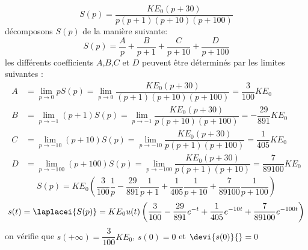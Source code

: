 \[
S(p)=\dfrac{KE_0(p+30)}{p(p+1)(p+10)(p+100)}
\]
décomposons $S(p)$ de la manière suivante:
\[
S(p)=\dfrac{A}{p}+\dfrac{B}{p+1}+\dfrac{C}{p+10}+\dfrac{D}{p+100}
\]
les différents coefficients $A$,$B$,$C$ et $D$ peuvent être déterminés par 
les limites suivantes :
\begin{align*}
    A&=\lim\limits_{p \rightarrow 0} p S(p) = 
    \lim\limits_{p \rightarrow 0} 
    \dfrac{KE_0(p+30)}{(p+1)(p+10)(p+100)} =
    \dfrac{3}{100}KE_0 \\
    B&=\lim\limits_{p \rightarrow -1} (p+1) S(p) = 
    \lim\limits_{p \rightarrow -1} 
    \dfrac{KE_0(p+30)}{p(p+10)(p+100)}=
    -\dfrac{29}{891}KE_0\\
    C&=\lim\limits_{p \rightarrow -10} (p+10) S(p) = 
    \lim\limits_{p \rightarrow -10} 
    \dfrac{KE_0(p+30)}{p(p+1)(p+100)}=
    \dfrac{1}{405}KE_0 \\
    D&=\lim\limits_{p \rightarrow -100} (p+100) S(p) = 
    \lim\limits_{p \rightarrow -100} 
    \dfrac{KE_0(p+30)}{p(p+1)(p+10)}=
    \dfrac{7}{89100}KE_0 
\end{align*}
\[
S(p) = KE_0\left(\dfrac{3}{100}  \dfrac{1}{p} -\dfrac{29}{891}\dfrac{1}{p+1} +
                                 \dfrac{1}{405}\dfrac{1}{p+10} + 
                                 \dfrac{7}{89100}\dfrac{1}{p+100} \right)
\]
\[
s(t) = \laplacei{S(p)} = KE_0u(t)\left(\dfrac{3}{100} - 
                         \dfrac{29}{891}e^{-t}+\dfrac{1}{405}e^{-10t}+
                         \dfrac{7}{89100}e^{-100t} \right) 
\]
on vérifie que $s(+\infty)=\dfrac{3}{100}KE_0$, $s(0)=0$ et $\devi{s(0)}{}=0$
\begin{center}
\end{center}
